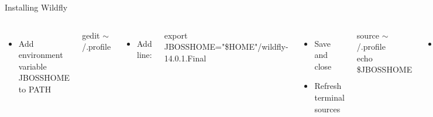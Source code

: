 \documentclass[aspectratio=1610,english]{beamer} %
\begin{document}
\begin{frame}{Installing Wildfly}
\begin{columns}
				\begin{itemize}
					\tiny
					\color{black}
					\item Add environment variable JBOSS\textunderscore HOME to PATH
				\end{itemize}
				\fontsize{4}{5} \selectfont
				gedit $\sim$/.profile
				
				\begin{itemize}
					\tiny
					\color{black}
					\item Add line:
				\end{itemize}
				\fontsize{4}{5} \selectfont
				export JBOSS\textunderscore HOME="\${HOME}"/wildfly-14.0.1.Final
				
				\begin{itemize}
					\tiny
					\color{black}
					\item Save and close
					\item Refresh terminal sources
				\end{itemize}
				\fontsize{4}{5} \selectfont
				source $\sim$/.profile \\
				echo \$JBOSS\textunderscore HOME
				
				\begin{itemize}
					\tiny
					\color{black}
					\item You should see variable \$JBOSS\textunderscore HOME like so
				\end{itemize}
				\fontsize{4}{5} \selectfont
				/home/jackdaeel/wildfly-14.0.1.Final
				
				\begin{itemize}
					\tiny
					\color{black}
					\item For Windows OS use .bat files instead .sh to run Wildfly scripts
					\item Basic info:
				\end{itemize}
				\fontsize{4}{5} \selectfont
				\begin{minipage}{\textwidth}
					
					\raggedright{
					Management console: \url{http://127.0.0.1:9990/} \\
					Application access endpoint: \url{http://127.0.0.1:8080/} 
					}
					\hfil \break
				\end{minipage}
				
				\begin{minipage}{\textwidth}
					

\end{minipage}
\end{columns}
\end{frame}
\end{document}
